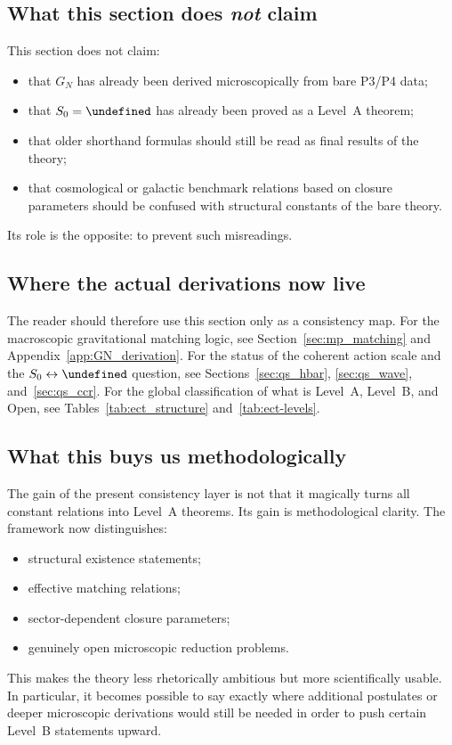 \documentclass[11pt,a4paper]{article}
\let\hbar\undefined
\numberwithin{equation}{section}
\begin{document}
\subsection*{What this section does \emph{not} claim}

This section does not claim:
\begin{itemize}
  \item that $G_N$ has already been derived microscopically from bare
  P3/P4 data;
  \item that $S_0=\hbar$ has already been proved as a Level~A theorem;
  \item that older shorthand formulas should still be read as final
  results of the theory;
  \item that cosmological or galactic benchmark relations based on
  closure parameters should be confused with structural constants of the
  bare theory.
\end{itemize}
Its role is the opposite: to prevent such misreadings.

\subsection*{Where the actual derivations now live}

The reader should therefore use this section only as a consistency map.
For the macroscopic gravitational matching logic, see
Section~\ref{sec:mp_matching} and Appendix~\ref{app:GN_derivation}.
For the status of the coherent action scale and the
$S_0\leftrightarrow\hbar$ question, see
Sections~\ref{sec:qs_hbar}, \ref{sec:qs_wave}, and~\ref{sec:qs_ccr}.
For the global classification of what is Level~A, Level~B,
and Open, see Tables~\ref{tab:ect_structure}
and~\ref{tab:ect-levels}.

\subsection*{What this buys us methodologically}

The gain of the present consistency layer is not that it magically turns
all constant relations into Level~A theorems.
Its gain is methodological clarity.
The framework now distinguishes:
\begin{itemize}
  \item structural existence statements;
  \item effective matching relations;
  \item sector-dependent closure parameters;
  \item genuinely open microscopic reduction problems.
\end{itemize}
This makes the theory less rhetorically ambitious but more scientifically
usable.
In particular, it becomes possible to say exactly where additional
postulates or deeper microscopic derivations would still be needed in
order to push certain Level~B statements upward.
\end{document}
